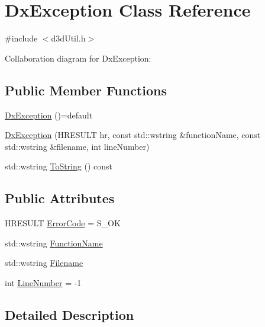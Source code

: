 \hypertarget{class_dx_exception}{}\section{Dx\+Exception Class Reference}
\label{class_dx_exception}


{\ttfamily \#include $<$d3d\+Util.\+h$>$}



Collaboration diagram for Dx\+Exception\+:
\subsection*{Public Member Functions}
\begin{DoxyCompactItemize}
\item 
\hyperlink{class_dx_exception_ae199bbd54f33491ced59c33517f44fe6_ae199bbd54f33491ced59c33517f44fe6}{Dx\+Exception} ()=default
\item 
\hyperlink{class_dx_exception_a73cee550c555eeb217d2abbcc564f2d9_a73cee550c555eeb217d2abbcc564f2d9}{Dx\+Exception} (H\+R\+E\+S\+U\+LT hr, const std\+::wstring \&function\+Name, const std\+::wstring \&filename, int line\+Number)
\item 
std\+::wstring \hyperlink{class_dx_exception_a693133a29d1a5dbe7710d040166fd8f7_a693133a29d1a5dbe7710d040166fd8f7}{To\+String} () const 
\end{DoxyCompactItemize}
\subsection*{Public Attributes}
\begin{DoxyCompactItemize}
\item 
H\+R\+E\+S\+U\+LT \hyperlink{class_dx_exception_ad772fc53a8ebf75f54718213aa45d635_ad772fc53a8ebf75f54718213aa45d635}{Error\+Code} = S\+\_\+\+OK
\item 
std\+::wstring \hyperlink{class_dx_exception_a8fa7d58ba60cc972f4eb4993dfd5bc56_a8fa7d58ba60cc972f4eb4993dfd5bc56}{Function\+Name}
\item 
std\+::wstring \hyperlink{class_dx_exception_a5b68341d8c7730eb9ae00b7ebcccdd69_a5b68341d8c7730eb9ae00b7ebcccdd69}{Filename}
\item 
int \hyperlink{class_dx_exception_aee30e6d56dfd40d6a73852503ebd8b7f_aee30e6d56dfd40d6a73852503ebd8b7f}{Line\+Number} = -\/1
\end{DoxyCompactItemize}


\subsection{Detailed Description}


